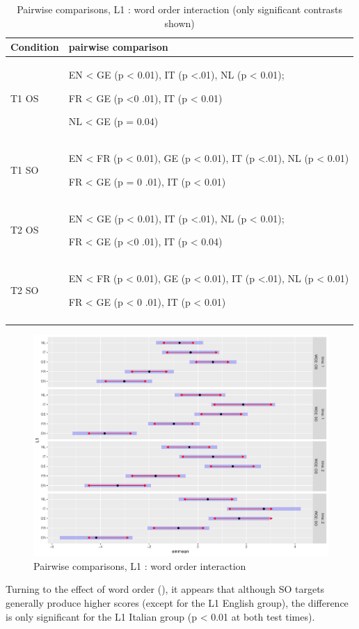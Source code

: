 \begin{table}
    \begin{tabularx}{\textwidth}{QQ}
    \lsptoprule
    Condition & pairwise comparison\\
    \midrule
    T1 OS & EN < GE (p < 0.01), IT (p <.01), NL (p < 0.01);
    
    FR < GE (p <0 .01), IT (p < 0.01)
    
    NL < GE (p = 0.04)\\
    T1 SO & EN < FR (p < 0.01), GE (p < 0.01), IT (p <.01), NL (p < 0.01)
    
    FR < GE (p = 0 .01), IT (p < 0.01)\\
    T2 OS & EN < GE (p < 0.01), IT (p <.01), NL (p < 0.01);
    
    FR < GE (p <0 .01), IT (p < 0.04)\\
    T2 SO & EN < FR (p < 0.01), GE (p < 0.01), IT (p <.01), NL (p < 0.01)
    
    FR < GE (p < 0 .01), IT (p < 0.01)\\
    \lspbottomrule
    \end{tabularx}
    \caption{Pairwise comparisons, L1 : word order interaction (only significant contrasts shown)}
    \label{tab:04:5}
\end{table}

\begin{figure}
    \includegraphics[width=\textwidth]{figures/04-3.pdf}
    \caption{Pairwise comparisons, L1 : word order interaction}
    \label{fig:04:3}
\end{figure}

Turning to the effect of word order (), it appears that although SO targets generally produce higher scores (except for the L1 English group), the difference is only significant for the L1 Italian group (p < 0.01 at both test times).

